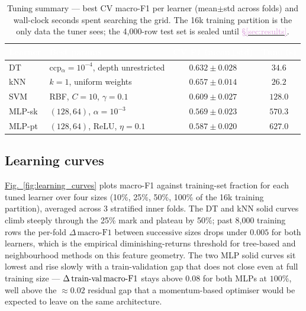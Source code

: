\documentclass[conference]{IEEEtran}
\newcommand{\figref}[1]{\hyperref[#1]{\textcolor{denim_comp}{Fig.~\ref*{#1}}}}
\newcommand{\secref}[1]{\hyperref[#1]{\textcolor{plum}{\S\ref*{#1}}}}
\begin{document}
\begin{table}[t]\centering
\caption{Tuning summary --- best CV macro-F1 per learner (mean$\pm$std across
folds) and wall-clock seconds spent searching the grid. The 16k training
partition is the only data the tuner sees; the 4{,}000-row test set is sealed
until \secref{sec:results}.}
\label{tab:tune_summary}
\centering\small
{}
\begin{tabularx}{\linewidth}{lXcc}
\toprule
\rowcolor{denimdark}
\textcolor{white}{\textbf{Learner}} &
\textcolor{white}{\textbf{Best params}} &
\textcolor{white}{\textbf{CV F1 (mean$\pm$std)}} &
\textcolor{white}{\textbf{Tune (s)}} \\
\midrule
DT       & ccp$_\alpha{=}10^{-4}$, depth unrestricted & $0.632\pm 0.028$ & $34.6$ \\
kNN      & $k{=}1$, uniform weights                  & $0.657\pm 0.014$ & $26.2$ \\
SVM      & RBF, $C{=}10$, $\gamma{=}0.1$             & $0.609\pm 0.027$ & $128.0$ \\
MLP-sk   & $(128,64)$, $\alpha{=}10^{-3}$            & $0.569\pm 0.023$ & $570.3$ \\
MLP-pt   & $(128,64)$, ReLU, $\eta{=}0.1$            & $0.587\pm 0.020$ & $627.0$ \\
\bottomrule
\end{tabularx}
\end{table}

\subsection{Learning curves}\label{sec:exp:lc}
\figref{fig:learning_curves} plots macro-F1 against training-set fraction for
each tuned learner over four sizes (10\%, 25\%, 50\%, 100\% of the 16k
training partition), averaged across 3 stratified inner folds. The DT and kNN
solid curves climb steeply through the 25\% mark and plateau by 50\%; past
8{,}000 training rows the per-fold $\Delta\,\text{macro-F1}$ between successive
sizes drops under $0.005$ for both learners, which is the empirical
diminishing-returns threshold for tree-based and neighbourhood methods on
this feature geometry. The two MLP solid curves sit lowest and rise slowly
with a train-validation gap that does not close even at full training
size --- $\Delta\,\text{train{-}val\,macro-F1}$ stays above $0.08$ for both
MLPs at $100\%$, well above the $\approx 0.02$ residual gap that a
momentum-based optimiser would be expected to leave on the same architecture.
\end{document}
